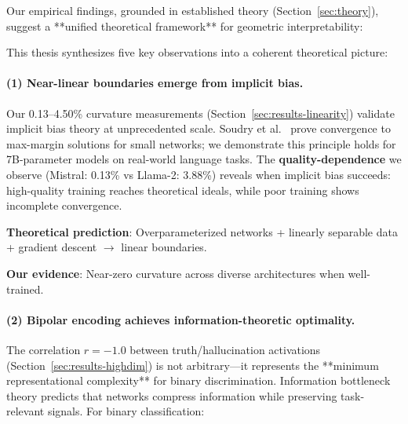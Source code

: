 \documentclass[11pt]{article}
\begin{document}
Our empirical findings, grounded in established theory (Section~\ref{sec:theory}), suggest a **unified theoretical framework** for geometric interpretability:

\begin{center}
\end{center}

This thesis synthesizes five key observations into a coherent theoretical picture:

\paragraph{(1) Near-linear boundaries emerge from implicit bias.}
Our 0.13--4.50\% curvature measurements (Section~\ref{sec:results-linearity}) validate implicit bias theory at unprecedented scale. Soudry et al.\ \citep{soudry2018implicit} prove convergence to max-margin solutions for small networks; we demonstrate this principle holds for 7B-parameter models on real-world language tasks. The \textbf{quality-dependence} we observe (Mistral: 0.13\% vs Llama-2: 3.88\%) reveals when implicit bias succeeds: high-quality training reaches theoretical ideals, while poor training shows incomplete convergence.

\textbf{Theoretical prediction}: Overparameterized networks + linearly separable data + gradient descent $\rightarrow$ linear boundaries.

\textbf{Our evidence}: Near-zero curvature across diverse architectures when well-trained.

\paragraph{(2) Bipolar encoding achieves information-theoretic optimality.}
The correlation $r=-1.0$ between truth/hallucination activations (Section~\ref{sec:results-highdim}) is not arbitrary—it represents the **minimum representational complexity** for binary discrimination. Information bottleneck theory \citep{tishby2015deep} predicts that networks compress information while preserving task-relevant signals. For binary classification:
\end{document}
